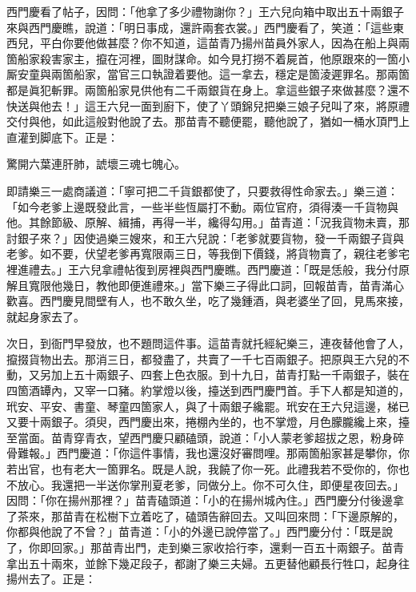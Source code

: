 西門慶看了帖子，因問：「他拿了多少禮物謝你？」王六兒向箱中取出五十兩銀子來與西門慶瞧，說道：「明日事成，還許兩套衣裳。」西門慶看了，笑道：「這些東西兒，平白你要他做甚麼？你不知道，這苗青乃揚州苗員外家人，因為在船上與兩箇船家殺害家主，攛在河裡，圖財謀命。如今見打撈不着屍首，他原跟來的一箇小厮安童與兩箇船家，當官三口執證着要他。這一拿去，穩定是箇淩遲罪名。那兩箇都是眞犯斬罪。兩箇船家見供他有二千兩銀貨在身上。拿這些銀子來做甚麼？還不快送與他去！」這王六兒一面到廚下，使了丫頭錦兒把樂三娘子兒叫了來，將原禮交付與他，如此這般對他說了去。那苗青不聽便罷，聽他說了，猶如一桶水頂門上直灌到脚底下。正是：

\begin{myquote}
驚開六葉連肝肺，諕壞三魂七魄心。
\end{myquote}

即請樂三一處商議道：「寧可把二千貨銀都使了，只要救得性命家去。」樂三道：「如今老爹上邊既發此言，一些半些恆屬打不動。兩位官府，須得湊一千貨物與他。其餘節級、原解、緝捕，再得一半，纔得勾用。」苗青道：「況我貨物未賣，那討銀子來？」因使過樂三嫂來，和王六兒說：「老爹就要貨物，發一千兩銀子貨與老爹。如不要，伏望老爹再寬限兩三日，等我倒下價錢，將貨物賣了，親往老爹宅裡進禮去。」王六兒拿禮帖復到房裡與西門慶瞧。西門慶道：「既是恁般，我分付原解且寬限他幾日，教他即便進禮來。」當下樂三子得此口詞，回報苗青，苗青滿心歡喜。西門慶見間壁有人，也不敢久坐，吃了幾鍾酒，與老婆坐了回，見馬來接，就起身家去了。

次日，到衙門早發放，也不題問這件事。這苗青就托經紀樂三，連夜替他會了人，攛掇貨物出去。那消三日，都發盡了，共賣了一千七百兩銀子。把原與王六兒的不動，又另加上五十兩銀子、四套上色衣服。到十九日，苗青打點一千兩銀子，裝在四箇酒罈內，又宰一口豬。約掌燈以後，擡送到西門慶門首。手下人都是知道的，玳安、平安、書童、琴童四箇家人，與了十兩銀子纔罷。玳安在王六兒這邊，梯已又要十兩銀子。須臾，西門慶出來，捲棚內坐的，也不掌燈，月色朦朧纔上來，{}擡至當面。苗青穿青衣，望西門慶只顧磕頭，說道：「小人蒙老爹超拔之恩，粉身碎骨難報。」西門慶道：「你這件事情，我也還沒好審問哩。那兩箇船家甚是攀你，你若出官，也有老大一箇罪名。既是人說，我饒了你一死。此禮我若不受你的，你也不放心。我還把一半送你掌刑夏老爹，同做分上。你不可久住，即便星夜回去。」因問：「你在揚州那裡？」苗青磕頭道：「小的在揚州城內住。」西門慶分付後邊拿了茶來，那苗青在松樹下立着吃了，磕頭告辭回去。又叫回來問：「下邊原解的，你都與他說了不曾？」苗青道：「小的外邊已說停當了。」西門慶分付：「既是說了，你即回家。」那苗青出門，走到樂三家收拾行李，還剩一百五十兩銀子。苗青拿出五十兩來，並餘下幾疋段子，都謝了樂三夫婦。五更替他顧長行牲口，起身往揚州去了。正是：


